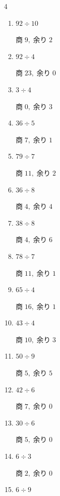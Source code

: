 \begin{multicols}{4}
\begin{enumerate}
        $商\; 4,\; 余り\; 2$

  \item $92 \div 10$

        $商\; 9,\; 余り\; 2$

  \item $92 \div 4$

        $商\; 23,\; 余り\; 0$

  \item $3 \div 4$

        $商\; 0,\; 余り\; 3$

  \item $36 \div 5$

        $商\; 7,\; 余り\; 1$

  \item $79 \div 7$

        $商\; 11,\; 余り\; 2$

  \item $36 \div 8$

        $商\; 4,\; 余り\; 4$

  \item $38 \div 8$

        $商\; 4,\; 余り\; 6$

  \item $78 \div 7$

        $商\; 11,\; 余り\; 1$

  \item $65 \div 4$

        $商\; 16,\; 余り\; 1$

  \item $43 \div 4$

        $商\; 10,\; 余り\; 3$

  \item $50 \div 9$

        $商\; 5,\; 余り\; 5$

  \item $42 \div 6$

        $商\; 7,\; 余り\; 0$

\columnbreak %

  \item $30 \div 6$

        $商\; 5,\; 余り\; 0$

  \item $6 \div 3$

        $商\; 2,\; 余り\; 0$

  \item $6 \div 9$


\end{enumerate}
\end{multicols}
